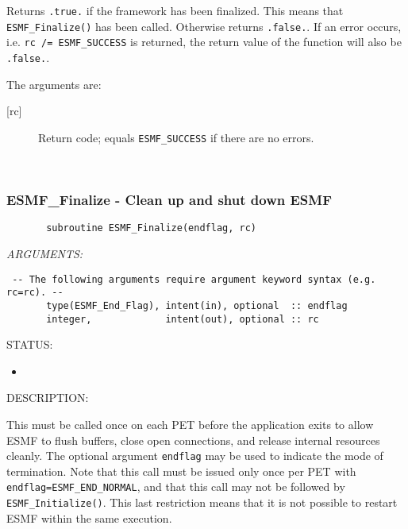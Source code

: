        Returns {\tt .true.} if the framework has been finalized. This means 
       that {\tt ESMF\_Finalize()} has been called. Otherwise returns
       {\tt .false.}. If an error occurs, i.e. {\tt rc /= ESMF\_SUCCESS} is 
       returned, the return value of the function will also be {\tt .false.}.
  
       The arguments are:
       \begin{description}
       \item [{[rc]}]
             Return code; equals {\tt ESMF\_SUCCESS} if there are no errors.
  
       \end{description} 
 
\mbox{}\hrulefill\ 
 
\subsubsection [ESMF\_Finalize] {ESMF\_Finalize - Clean up and shut down ESMF}


  
\begin{verbatim}       subroutine ESMF_Finalize(endflag, rc)\end{verbatim}{\em ARGUMENTS:}
\begin{verbatim} -- The following arguments require argument keyword syntax (e.g. rc=rc). --
       type(ESMF_End_Flag), intent(in), optional  :: endflag
       integer,             intent(out), optional :: rc
 \end{verbatim}
{\sf STATUS:}
   \begin{itemize}
   \item{}
   \end{itemize}
  
{\sf DESCRIPTION:\\ }


       This must be called once on each PET before the application exits
       to allow ESMF to flush buffers, close open connections, and 
       release internal resources cleanly. The optional argument 
       {\tt endflag} may be used to indicate the mode of termination.  
       Note that this call must be issued only once per PET with 
       {\tt endflag=ESMF\_END\_NORMAL}, and that this call may not be followed
       by {\tt ESMF\_Initialize()}.  This last restriction means that it is not
       possible to restart ESMF within the same execution.
  

